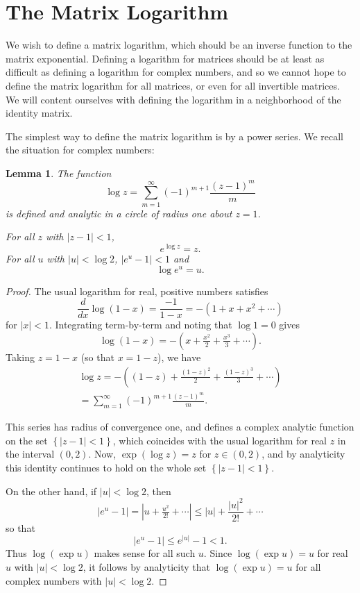 \documentclass{amsbook}
\theoremstyle{plain}
\newtheorem{lemma}[theorem]{Lemma}
\numberwithin{equation}{chapter}
\numberwithin{theorem}{chapter}
\begin{document}
\section{The Matrix Logarithm\label{matrix.log}}

We wish to define a matrix logarithm, which should be an inverse function to
the matrix exponential. Defining a logarithm for matrices should be at least
as difficult as defining a logarithm for complex numbers, and so we cannot
hope to define the matrix logarithm for all matrices, or even for all
invertible matrices. We will content ourselves with defining the logarithm in
a neighborhood of the identity matrix.

The simplest way to define the matrix logarithm is by a power series. We
recall the situation for complex numbers:

\begin{lemma}
The function
\[
\log z=\sum_{m=1}^{\infty}(-1)^{m+1}\frac{(z-1)^{m}}{m}%
\]
is defined and analytic in a circle of radius one about $z=1$.

For all $z$ with $\left|  z-1\right|  <1$,
\[
e^{\log z}=z\text{.}%
\]
For all $u$ with $\left|  u\right|  <\log2$, $\left|  e^{u}-1\right|  <1$ and
\[
\log e^{u}=u\text{.}%
\]
\end{lemma}

\begin{proof}
The usual logarithm for real, positive numbers satisfies
\[
\frac{d}{dx}\log(1-x)=\frac{-1}{1-x}=-\left(  1+x+x^{2}+\cdots\right)
\]
for $\left|  x\right|  <1$. Integrating term-by-term and noting that $\log1=0$
gives
\[
\log(1-x)=-\left(  x+\tfrac{x^{2}}{2}+\tfrac{x^{3}}{3}+\cdots\right)  \text{.}%
\]
Taking $z=1-x$ (so that $x=1-z$), we have
\begin{align*}
\log z=-\left(  (1-z)+\tfrac{(1-z)^{2}}{2}+\tfrac{(1-z)^{3}}{3}+\cdots\right)
\\
=\sum_{m=1}^{\infty}(-1)^{m+1}\frac{(z-1)^{m}}{m}\text{.}%
\end{align*}

This series has radius of convergence one, and defines a complex analytic
function on the set $\left\{  \left|  z-1\right|  <1\right\}  $, which
coincides with the usual logarithm for real $z$ in the interval $(0,2)$. Now,
$\exp(\log z)=z$ for $z\in(0,2)$, and by analyticity this identity continues
to hold on the whole set $\left\{  \left|  z-1\right|  <1\right\}  $.

On the other hand, if $\left|  u\right|  <\log2$, then
\[
\left|  e^{u}-1\right|  =\left|  u+\tfrac{u^{2}}{2!}+\cdots\right|
\leq\left|  u\right|  +\frac{\left|  u\right|  ^{2}}{2!}+\cdots
\]
so that
\[
\left|  e^{u}-1\right|  \leq e^{\left|  u\right|  }-1<1\text{.}%
\]
Thus $\log(\exp u)$ makes sense for all such $u$. Since $\log(\exp u)=u$ for
real $u$ with $\left|  u\right|  <\log2$, it follows by analyticity that
$\log(\exp u)=u$ for all complex numbers with $\left|  u\right|  <\log2$.
\end{proof}
\end{document}
